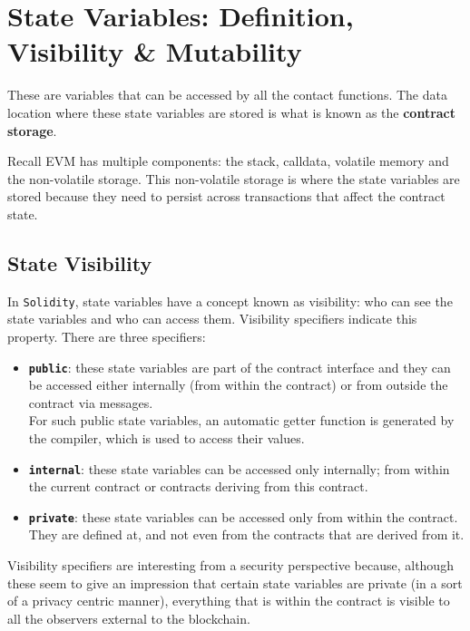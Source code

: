 \section{State Variables: Definition, Visibility \&
Mutability}\label{state-variables-definition-visibility-mutability}

These are variables that can be accessed by all the contact functions.
The data location where these state variables are stored is what is
known as the \textbf{contract storage}.

Recall EVM has multiple components: the stack, calldata, volatile memory
and the non-volatile storage. This non-volatile storage is where the
state variables are stored because they need to persist across
transactions that affect the contract state.

\subsection{State Visibility}\label{state-visibility}

In \texttt{Solidity}, state variables have a concept known as
visibility: who can see the state variables and who can access them.
Visibility specifiers indicate this property. There are three
specifiers:

\begin{itemize}
\item
  \textbf{\texttt{public}}: these state variables are part of the
  contract interface and they can be accessed either internally (from
  within the contract) or from outside the contract via messages.\\

  For such public state variables, an automatic getter function is
  generated by the compiler, which is used to access their values.
\item
  \textbf{\texttt{internal}}: these state variables can be accessed only
  internally; from within the current contract or contracts deriving
  from this contract.
\item
  \textbf{\texttt{private}}: these state variables can be accessed only
  from within the contract.\\

  They are defined at, and not even from the contracts that are derived
  from it.
\end{itemize}

Visibility specifiers are interesting from a security perspective
because, although these seem to give an impression that certain state
variables are private (in a sort of a privacy centric manner),
everything that is within the contract is visible to all the observers
external to the blockchain.

